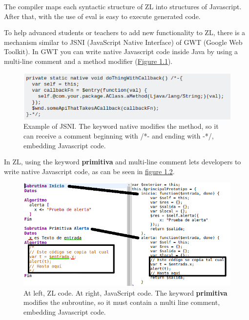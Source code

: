 \documentclass{report}
\begin{document}
	The compiler maps each syntactic structure of ZL into structures of Javascript. After that, with the use of eval\cite{javascripteval} is easy to execute generated code.
	
	To help advanced students or teachers to add new functionality to ZL, there is a mechanism similar to JSNI (JavaScript Native Interface) of GWT (Google Web Toolkit). In GWT you can write native Javascript code inside Java by using a multi-line comment and a method modifier (\hyperref[fig:jnsiexample]{Figure 1.1}).

\begin{figure}
\centering
\includegraphics[width=1\linewidth]{jnsiexample}
\caption[Example of JSNI]{Example of JSNI. The keyword native modifies the method, so it can receive a comment beginning with /*- and ending with -*/, embedding Javascript code.}
\label{fig:jnsiexample}
\end{figure}

	In ZL, using the keyword \textbf{primitiva} and multi-line comment lets developers to write native Javascript code, as can be seen in \hyperref[fig:zlcode]{figure 1.2}.
	
	\begin{figure}
	\label{fig:zlcode}
	\centering
	\includegraphics[width=1\linewidth]{zlyjs}
	\caption[Native JavaScript code written in ZL]{At left, ZL code. At right, JavaScript code. The keyword \textbf{primitiva} modifies the subroutine, so it must contain a multi line comment, embedding Javascript code.}
	\end{figure}
	
\end{document}
